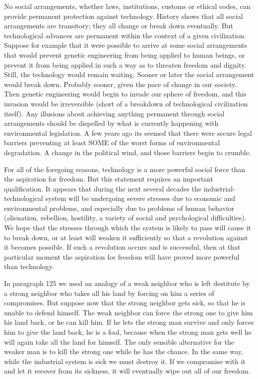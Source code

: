  No social arrangements, whether laws, institutions, customs or ethical codes, can provide permanent protection against technology. History shows that all social arrangements are transitory; they all change or break down eventually. But technological advances are permanent within the context of a given civilization. Suppose for example that it were possible to arrive at some social arrangements that would prevent genetic engineering from being applied to human beings, or prevent it from being applied in such a way as to threaten freedom and dignity. Still, the technology would remain waiting. Sooner or later the social arrangement would break down. Probably sooner, given the pace of change in our society. Then genetic engineering would begin to invade our sphere of freedom, and this invasion would be irreversible (short of a breakdown of technological civilization itself). Any illusions about achieving anything permanent through social arrangements should be dispelled by what is currently happening with environmental legislation. A few years ago its seemed that there were secure legal barriers preventing at least SOME of the worst forms of environmental degradation. A change in the political wind, and those barriers begin to crumble.

 For all of the foregoing reasons, technology is a more powerful social force than the aspiration for freedom. But this statement requires an important qualification. It appears that during the next several decades the industrial-technological system will be undergoing severe stresses due to economic and environmental problems, and especially due to problems of human behavior (alienation, rebellion, hostility, a variety of social and psychological difficulties). We hope that the stresses through which the system is likely to pass will cause it to break down, or at least will weaken it sufficiently so that a revolution against it becomes possible. If such a revolution occurs and is successful, then at that particular moment the aspiration for freedom will have proved more powerful than technology.

 In paragraph 125 we used an analogy of a weak neighbor who is left destitute by a strong neighbor who takes all his land by forcing on him a series of compromises. But suppose now that the strong neighbor gets sick, so that he is unable to defend himself. The weak neighbor can force the strong one to give him his land back, or he can kill him. If he lets the strong man survive and only forces him to give the land back, he is a fool, because when the strong man gets well he will again take all the land for himself. The only sensible alternative for the weaker man is to kill the strong one while he has the chance. In the same way, while the industrial system is sick we must destroy it. If we compromise with it and let it recover from its sickness, it will eventually wipe out all of our freedom.

